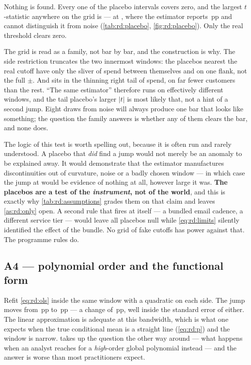 


Nothing is found. Every one of the \nbNinePlaceboN{} placebo intervals covers zero, and the largest
$t$-statistic anywhere on the grid is \nbNinePlaceboMaxT{} --- at \eur{\nbNinePlaceboMaxCut}, where
the estimator reports \nbNinePlaceboMaxJump{}\,pp and cannot distinguish it from noise
(\cref{tab:rd:placebo}, \cref{fig:rd:placebo}). Only the real threshold clears zero.

The grid is read as a family, not bar by bar, and the construction is why. The side restriction
truncates the two innermost windows: the placebos nearest the real cutoff have only the sliver of
spend between themselves and \eur{\nbNineCutoff} on one flank, not the full
$\pm$\eur{\nbNinePlaceboBw}. And \eur{\nbNinePlaceboMaxCut} sits in the thinning right tail of
spend, on far fewer customers than the rest. ``The same estimator'' therefore runs on effectively
different windows, and the tail placebo's larger $|t|$ is most likely that, not a hint of a second
jump. Eight draws from noise will always produce one bar that looks like something; the question the
family answers is whether any of them clears the bar, and none does.

The logic of this test is worth spelling out, because it is often run and rarely understood. A
placebo that \emph{did} find a jump would not merely be an anomaly to be explained away. It would
demonstrate that the estimator manufactures discontinuities out of curvature, noise or a badly
chosen window --- in which case the jump at \eur{\nbNineCutoff} would be evidence of nothing at all,
however large it was. \textbf{The placebos are a test of the \emph{instrument}, not of the world},
and this is exactly why \cref{tab:rd:assumptions} grades them on that claim and leaves
\cref{as:rd:only} open. A second rule that fires at \eur{\nbNineCutoff} itself --- a bundled email
cadence, a different service tier --- would leave all \nbNinePlaceboN{} placebos null while
\cref{eq:rd:limits} silently identified the effect of the bundle. No grid of fake cutoffs has power
against that. The programme rules do.

\subsection*{A4 --- polynomial order and the functional form}

Refit \cref{eq:rd:ols} inside the same window with a quadratic on each side. The jump moves from
\nbNinePolyLinear{}\,pp to \nbNinePolyQuadratic{}\,pp --- a change of \nbNinePolyDiff{}\,pp, well
inside the standard error of either. The linear approximation is adequate at this bandwidth, which
is what one expects when the true conditional mean is a straight line (\cref{eq:rd:p}) and the
window is narrow.  takes up the question the other way around --- what happens
when an analyst reaches for a \emph{high}-order global polynomial instead --- and the answer is
worse than most practitioners expect.


